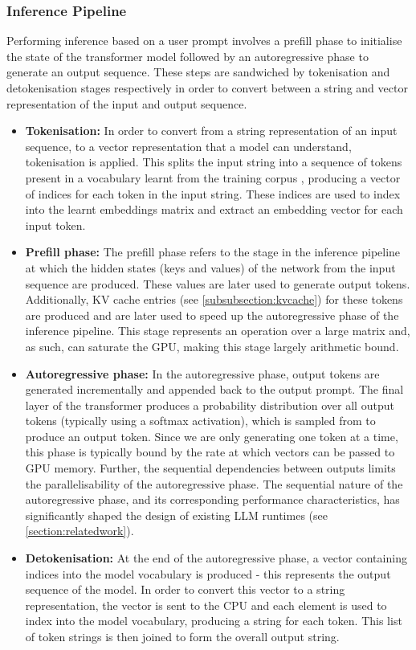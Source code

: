 \documentclass[12pt,twoside]{report}
\begin{document}
\subsubsection{Inference Pipeline}\label{subsubsection:inferencepipeline}
Performing inference based on a user prompt involves a prefill phase to initialise the state of the transformer model followed by an autoregressive phase to generate an output sequence.
These steps are sandwiched by tokenisation and detokenisation stages respectively in order to convert between a string and vector representation of the input and output sequence.
\begin{itemize}
  \item \textbf{Tokenisation:}
    In order to convert from a string representation of an input sequence, to a vector representation that a model can understand, tokenisation is applied.
    This splits the input string into a sequence of tokens present in a vocabulary learnt from the training corpus \cite{radford2019language} \cite{sennrich2015neural}, producing a vector of indices for each token in the input string.
    These indices are used to index into the learnt embeddings matrix and extract an embedding vector for each input token.
  \item \textbf{Prefill phase:}
    The prefill phase refers to the stage in the inference pipeline at which the hidden states (keys and values) of the network from the input sequence are produced.
    These values are later used to generate output tokens.
    Additionally, KV cache entries (see \ref{subsubsection:kvcache}) for these tokens are produced and are later used to speed up the autoregressive phase of the inference pipeline.
    This stage represents an operation over a large matrix and, as such, can saturate the GPU, making this stage largely arithmetic bound.
  \item \textbf{Autoregressive phase:}
    In the autoregressive phase, output tokens are generated incrementally and appended back to the output prompt. 
    The final layer of the transformer produces a probability distribution over all output tokens (typically using a softmax activation), which is sampled from to produce an output token.
    Since we are only generating one token at a time, this phase is typically bound by the rate at which vectors can be passed to GPU memory.
    Further, the sequential dependencies between outputs limits the parallelisability of the autoregressive phase.
    The sequential nature of the autoregressive phase, and its corresponding performance characteristics, has significantly shaped the design of existing LLM runtimes (see \ref{section:relatedwork}).
  \item \textbf{Detokenisation:}
    At the end of the autoregressive phase, a vector containing indices into the model vocabulary is produced - this represents the output sequence of the model.
    In order to convert this vector to a string representation, the vector is sent to the CPU and each element is used to index into the model vocabulary, producing a string for each token.
    This list of token strings is then joined to form the overall output string.
\end{itemize}
\end{document}
